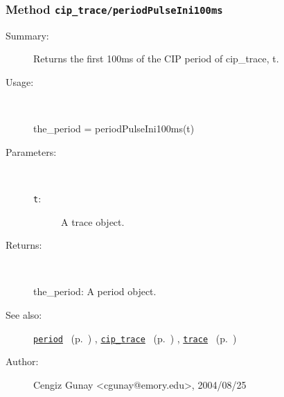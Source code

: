 \subsubsection[Method \texttt{periodPulseIni100ms}]{Method \texttt{cip\_trace/periodPulseIni100ms}}%
%
\label{ref_cip_trace__periodPulseIni100ms}%
\hypertarget{ref_cip_trace__periodPulseIni100ms}{}%
\begin{description}
\item[Summary:]Returns the first 100ms of the CIP period of 
			cip\_trace, t. 
%
\item[Usage:]~%
\begin{lyxcode}%
the\_period = periodPulseIni100ms(t)
%
\end{lyxcode}%
%
%
\item[Parameters:]~
\begin{description}%
\item[\texttt{t}:]
 A trace object.
\end{description}%
%
\item[Returns:]~

	the\_period: A period object.
%
%
\item[See also:]%
\hyperlink{ref_period}{\texttt{period}}%
\ (p.~\pageref{ref_period})%
%
, \hyperlink{ref_cip_trace}{\texttt{cip\_trace}}%
\ (p.~\pageref{ref_cip_trace})%
%
, \hyperlink{ref_trace}{\texttt{trace}}%
\ (p.~\pageref{ref_trace})%
%
%
\item[Author:]%
Cengiz Gunay <cgunay@emory.edu>, 2004/08/25%
\end{description}
\methodline%
